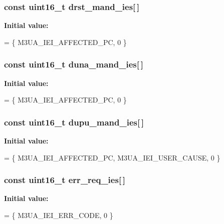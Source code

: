 \subsubsection[{drst\+\_\+mand\+\_\+ies}]{\setlength{\rightskip}{0pt plus 5cm}const uint16\+\_\+t drst\+\_\+mand\+\_\+ies[$\,$]\hspace{0.3cm}{\ttfamily [static]}}\label{m3ua_8c_a48ecf604e0c72bd179d70840c8db0619}
{\bfseries Initial value\+:}
\begin{DoxyCode}
= \{
        M3UA_IEI_AFFECTED_PC, 0
\}
\end{DoxyCode}
\subsubsection[{duna\+\_\+mand\+\_\+ies}]{\setlength{\rightskip}{0pt plus 5cm}const uint16\+\_\+t duna\+\_\+mand\+\_\+ies[$\,$]\hspace{0.3cm}{\ttfamily [static]}}\label{m3ua_8c_a83031dada44b3b406e668d70e6d54400}
{\bfseries Initial value\+:}
\begin{DoxyCode}
= \{
        M3UA_IEI_AFFECTED_PC, 0
\}
\end{DoxyCode}
\subsubsection[{dupu\+\_\+mand\+\_\+ies}]{\setlength{\rightskip}{0pt plus 5cm}const uint16\+\_\+t dupu\+\_\+mand\+\_\+ies[$\,$]\hspace{0.3cm}{\ttfamily [static]}}\label{m3ua_8c_a12710cbc13bd1ece48359ef1a5447d7a}
{\bfseries Initial value\+:}
\begin{DoxyCode}
= \{
        M3UA_IEI_AFFECTED_PC, M3UA_IEI_USER_CAUSE, 0
\}
\end{DoxyCode}
\subsubsection[{err\+\_\+req\+\_\+ies}]{\setlength{\rightskip}{0pt plus 5cm}const uint16\+\_\+t err\+\_\+req\+\_\+ies[$\,$]\hspace{0.3cm}{\ttfamily [static]}}\label{m3ua_8c_aabba7438715175738fe3cb7ef7f2ff3a}
{\bfseries Initial value\+:}
\begin{DoxyCode}
= \{
        M3UA_IEI_ERR_CODE, 0
\}
\end{DoxyCode}
